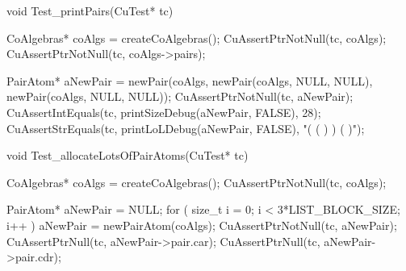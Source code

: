 void Test_printPairs(CuTest* tc) {
  CoAlgebras* coAlgs = createCoAlgebras();
  CuAssertPtrNotNull(tc, coAlgs);
  CuAssertPtrNotNull(tc, coAlgs->pairs);

  PairAtom* aNewPair = newPair(coAlgs,
                               newPair(coAlgs, NULL, NULL),
                               newPair(coAlgs, NULL, NULL));
  CuAssertPtrNotNull(tc, aNewPair);
  CuAssertIntEquals(tc, printSizeDebug(aNewPair, FALSE), 28);
  CuAssertStrEquals(tc, printLoLDebug(aNewPair, FALSE), "( ( ) ) ( )");
}

void Test_allocateLotsOfPairAtoms(CuTest* tc) {
  CoAlgebras* coAlgs = createCoAlgebras();
  CuAssertPtrNotNull(tc, coAlgs);

  PairAtom* aNewPair = NULL;
  for ( size_t i = 0; i < 3*LIST_BLOCK_SIZE; i++ ) {
    aNewPair = newPairAtom(coAlgs);
  }
  CuAssertPtrNotNull(tc, aNewPair);
  CuAssertPtrNull(tc, aNewPair->pair.car);
  CuAssertPtrNull(tc, aNewPair->pair.cdr);
}
\stoptyping
